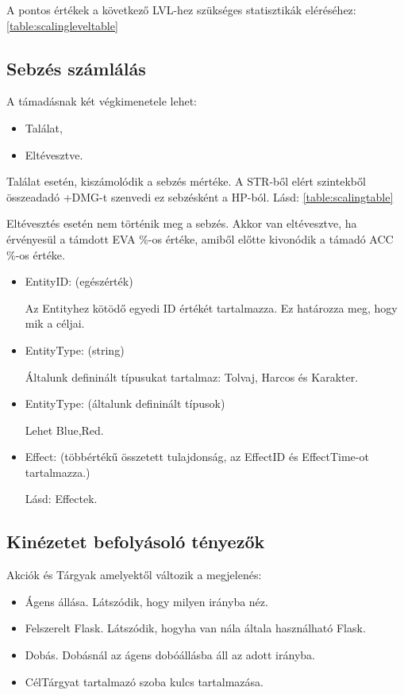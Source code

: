 \noindent A pontos értékek a következő LVL-hez szükséges statisztikák eléréséhez: \ref{table:scalingleveltable}

\subsection{Sebzés számlálás}

\label{számlálás}

A támadásnak két végkimenetele lehet:

\begin{itemize}
    \item Találat,
    \item Eltévesztve.
\end{itemize}

\noindent Találat esetén, kiszámolódik a sebzés mértéke. A STR-ből elért szintekből összeadadó +DMG-t szenvedi ez sebzésként a HP-ból. Lásd: \ref{table:scalingtable}

\noindent Eltévesztés esetén nem történik meg a sebzés. Akkor van eltévesztve, ha érvényesül a támdott EVA \%-os értéke, amiből előtte kivonódik a támadó ACC \%-os értéke.


\begin{itemize}
    \item EntityID: (egészérték)
    
    Az Entityhez kötödő egyedi ID értékét tartalmazza. Ez határozza meg, hogy mik a céljai.
    \item EntityType: (string)
    
    Általunk defininált típusukat tartalmaz: Tolvaj, Harcos és Karakter.
    \item EntityType: (általunk defininált típusok)
    
    Lehet Blue,Red.
    \item Effect: (többértékű összetett tulajdonság, az EffectID és EffectTime-ot tartalmazza.)
    
    Lásd: Effectek.
\end{itemize}

\subsection{Kinézetet befolyásoló tényezők}

\noindent Akciók és Tárgyak amelyektől változik a megjelenés:

\begin{itemize}
    \item Ágens állása. Látszódik, hogy milyen irányba néz.
    \item Felszerelt Flask. Látszódik, hogyha van nála általa használható Flask.
    \item Dobás. Dobásnál az ágens dobóállásba áll az adott irányba.
    \item CélTárgyat tartalmazó szoba kulcs tartalmazása.
\end{itemize}

